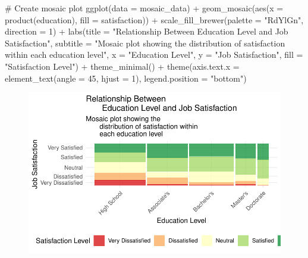 \documentclass[
  letterpaper,
  DIV=11,
  numbers=noendperiod]{scrartcl}
\newenvironment{Shaded}{\begin{snugshade}}{\end{snugshade}}
\newcommand{\AttributeTok}[1]{\textcolor[rgb]{0.40,0.45,0.13}{#1}}
\newcommand{\CommentTok}[1]{\textcolor[rgb]{0.37,0.37,0.37}{#1}}
\newcommand{\DecValTok}[1]{\textcolor[rgb]{0.68,0.00,0.00}{#1}}
\newcommand{\FunctionTok}[1]{\textcolor[rgb]{0.28,0.35,0.67}{#1}}
\newcommand{\NormalTok}[1]{\textcolor[rgb]{0.00,0.23,0.31}{#1}}
\newcommand{\SpecialCharTok}[1]{\textcolor[rgb]{0.37,0.37,0.37}{#1}}
\newcommand{\StringTok}[1]{\textcolor[rgb]{0.13,0.47,0.30}{#1}}
\begin{document}
\begin{Shaded}
\begin{Highlighting}[]
\CommentTok{\# Create mosaic plot}
\FunctionTok{ggplot}\NormalTok{(}\AttributeTok{data =}\NormalTok{ mosaic\_data) }\SpecialCharTok{+}
  \FunctionTok{geom\_mosaic}\NormalTok{(}\FunctionTok{aes}\NormalTok{(}\AttributeTok{x =} \FunctionTok{product}\NormalTok{(education), }
                  \AttributeTok{fill =}\NormalTok{ satisfaction)) }\SpecialCharTok{+}
  \FunctionTok{scale\_fill\_brewer}\NormalTok{(}\AttributeTok{palette =} \StringTok{"RdYlGn"}\NormalTok{, }\AttributeTok{direction =} \DecValTok{1}\NormalTok{) }\SpecialCharTok{+}
  \FunctionTok{labs}\NormalTok{(}\AttributeTok{title =} \StringTok{"Relationship Between }
\StringTok{       Education Level and Job Satisfaction"}\NormalTok{,}
       \AttributeTok{subtitle =} \StringTok{"Mosaic plot showing the }
\StringTok{       distribution of satisfaction within }
\StringTok{       each education level"}\NormalTok{,}
       \AttributeTok{x =} \StringTok{"Education Level"}\NormalTok{,}
       \AttributeTok{y =} \StringTok{"Job Satisfaction"}\NormalTok{,}
       \AttributeTok{fill =} \StringTok{"Satisfaction Level"}\NormalTok{) }\SpecialCharTok{+}
  \FunctionTok{theme\_minimal}\NormalTok{() }\SpecialCharTok{+}
  \FunctionTok{theme}\NormalTok{(}\AttributeTok{axis.text.x =} \FunctionTok{element\_text}\NormalTok{(}\AttributeTok{angle =} \DecValTok{45}\NormalTok{, }\AttributeTok{hjust =} \DecValTok{1}\NormalTok{),}
         \AttributeTok{legend.position =} \StringTok{"bottom"}\NormalTok{)}
\end{Highlighting}
\end{Shaded}

\begin{figure}[H]

{\centering \includegraphics{Ordinal_data_an_R_files/figure-pdf/unnamed-chunk-5-1.pdf}

}

\end{figure}
\end{document}
